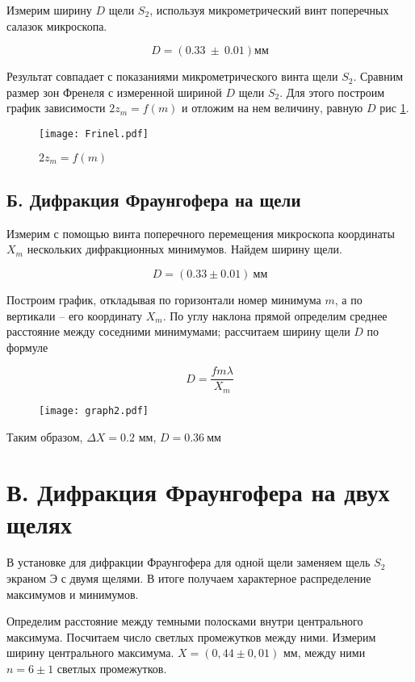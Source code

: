

Измерим ширину $D$ щели $S_2$, используя микрометрический винт поперечных салазок микроскопа.

\[ D = (0.33 ~ \pm ~ 0.01) \text{мм} \]

Результат совпадает с показаниями микрометрического винта щели $S_2$. Сравним размер зон Френеля с измеренной шириной $D$ щели $S_2$. Для этого построим график зависимости $2 z_m = f(m)$ и отложим на нем величину, равную $D$ рис \ref{fig:Frinel}.

\begin{figure}
	\centering
	\texttt{[image: Frinel.pdf]}
	\caption{$2 z_m = f(m)$}
	\label{fig:Frinel}
\end{figure}

\subsection*{Б. Дифракция Фраунгофера на щели}

Измерим с помощью винта поперечного перемещения микроскопа координаты $X_m$ нескольких дифракционных минимумов. Найдем ширину щели.



\[ D = (0.33 \pm 0.01) ~ \text{мм} \]

Построим график, откладывая по горизонтали номер минимума $m$, а по вертикали -- его координату $X_m$. По углу наклона прямой определим среднее расстояние между соседними минимумами; рассчитаем ширину щели $D$ по формуле

\[ D = \frac{f m \lambda}{X_m} \]

\begin{figure}
	\centering
	\texttt{[image: graph2.pdf]}
	\caption{}
\end{figure}

Таким образом, $\Delta X = 0.2$ мм, $D = 0.36 ~ \text{мм}$

\section*{В. Дифракция Фраунгофера на двух щелях}

В установке для дифракции Фраунгофера для одной щели заменяем щель $S_2$ экраном Э с двумя щелями. В итоге получаем характерное распределение максимумов и минимумов.

Определим расстояние между темными полосками внутри центрального максимума. Посчитаем число светлых промежутков между ними. Измерим ширину центрального максимума. $X = (0,44 \pm 0,01)$ мм, между ними $n = 6 \pm 1$ светлых промежутков.

